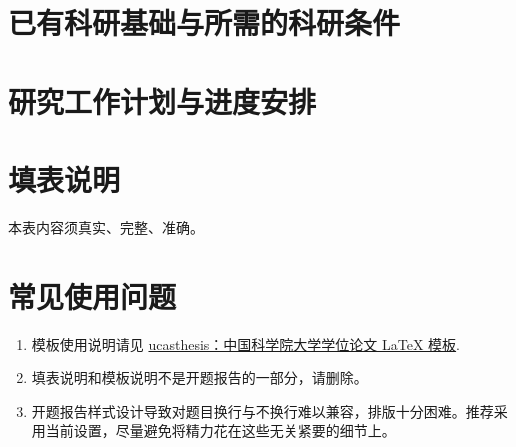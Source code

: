 \section{已有科研基础与所需的科研条件}

\section{研究工作计划与进度安排}

\section*{填表说明}

本表内容须真实、完整、准确。

\section*{常见使用问题}

\begin{enumerate}
    \item 模板使用说明请见 \href{https://github.com/mohuangrui/ucasthesis}{ucasthesis：中国科学院大学学位论文 LaTeX 模板}.
    \item 填表说明和模板说明不是开题报告的一部分，请删除。
    \item 开题报告样式设计导致对题目换行与不换行难以兼容，排版十分困难。推荐采用当前设置，尽量避免将精力花在这些无关紧要的细节上。
\end{enumerate}

\nocite{*}%

